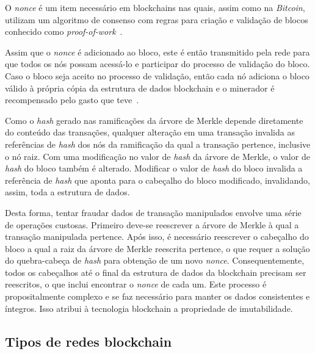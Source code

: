 O \textit{nonce} é um item necessário em blockchains nas quais, assim como na \textit{Bitcoin}, utilizam um algoritmo de consenso com regras para criação e validação de blocos conhecido como \textit{proof-of-work}~\cite{overview-bitcoin2008nakamoto}.

Assim que o \textit{nonce} é adicionado ao bloco, este é então transmitido pela rede para que todos os nós possam acessá-lo e participar do processo de validação do bloco. Caso o bloco seja aceito no processo de validação, então cada nó adiciona o bloco válido à própria cópia da estrutura de dados blockchain e o minerador é recompensado pelo gasto que teve~\cite{overview-bitcoin2008nakamoto}.

Como o \textit{hash} gerado nas ramificações da árvore de Merkle depende diretamente do conteúdo das transações, qualquer alteração em uma transação invalida as referências de \textit{hash} dos nós da ramificação da qual a transação pertence, inclusive o nó raiz. Com uma modificação no valor de \textit{hash} da árvore de Merkle, o valor de \textit{hash} do bloco também é alterado. Modificar o valor de \textit{hash} do bloco invalida a referência de \textit{hash} que aponta para o cabeçalho do bloco modificado, invalidando, assim, toda a estrutura de dados.

Desta forma, tentar fraudar dados de transação manipulados envolve uma série de operações custosas. Primeiro deve-se reescrever a árvore de Merkle à qual a transação manipulada pertence. Após isso, é necessário reescrever o cabeçalho do bloco a qual a raiz da árvore de Merkle reescrita pertence, o que requer a solução do quebra-cabeça de \textit{hash} para obtenção de um novo \textit{nonce}. Consequentemente, todos os cabeçalhos até o final da estrutura de dados da blockchain precisam ser reescritos, o que inclui encontrar o \textit{nonce} de cada um. Este processo é propositalmente complexo e se faz necessário para manter os dados consistentes e íntegros. Isso atribui à tecnologia blockchain a propriedade de imutabilidade.


\subsection{Tipos de redes blockchain} \label{tex:fund:blockchain:tipo}


